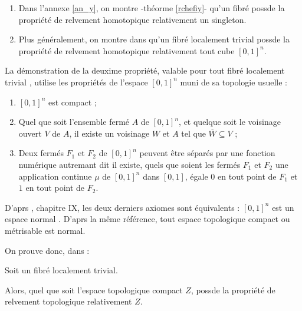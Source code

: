 \begin{exem}
\begin{enumerate}
\item Dans l'annexe \ref{an_y}, on montre -th\'eorme \ref{rchefiy}- qu'un fibr\'e \Fiy %
possde la propri\'et\'e de relvement homotopique relativement  un singleton.
%
\item Plus g\'en\'eralement, on montre dans \cite{NaberF} qu'un fibr\'e localement trivial \Fiy %
possde la propri\'et\'e de relvement homotopique relativement  tout cube $[0,1]^n$.
\end{enumerate}
\end{exem}

\begin{minipage}{\textwidth}
La d\'emonstration de la deuxime propri\'et\'e, valable pour tout fibr\'e localement trivial \Fiy , %
utilise les propri\'et\'es de l'espace $[0,1]^n$ muni de sa topologie usuelle :

\begin{enumerate}[label=(A\arabic *)]
\item $[0,1]^n$ est compact ;
\item Quel que soit l'ensemble ferm\'e $A$ de $[0,1]^n$, et quelque soit le voisinage ouvert $V$ de $A$, %
il existe un voisinage $W$ et $A$ tel que $\overline{W}\subseteq V$ ;
\item Deux ferm\'es $F_1$ et $F_2$ de $[0,1]^n$ peuvent \^etre s\'epar\'es par une fonction num\'erique autremant dit il existe, %
quels que soient les ferm\'es $F_1$ et $F_2$ une application continue $\mu$ de $[0,1]^n$ dans $[0,1]$, %
\'egale  $0$ en tout point de $F_1$ et  $1$ en tout point de $F_2$.
\end{enumerate}

\etoile
\end{minipage}

D'aprs \cite{BouTG}, chapitre IX, les deux derniers axiomes sont \'equivalents  : \og{} $[0,1]^n$ est un espace normal \fg{}. %
D'aprs la m\^eme r\'ef\'erence, tout espace topologique compact ou m\'etrisable est normal.

\par
On prouve donc, dans \cite{NaberF} :

\begin{theo}
Soit \Fiy un fibr\'e localement trivial.

\par
Alors, quel que soit l'espace topologique compact $Z$, \Fiy possde la propri\'et\'e de relvement topologique relativement  $Z$.
\end{theo}

